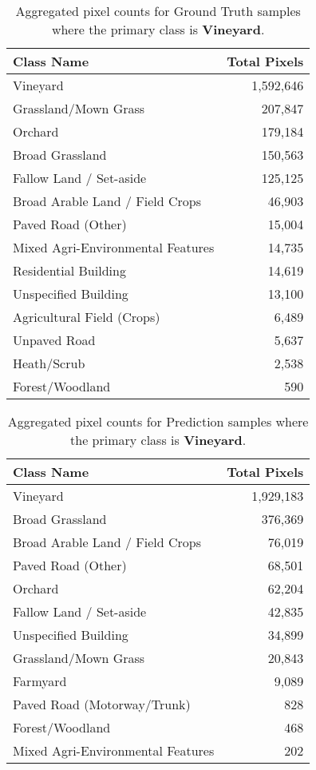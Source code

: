 \begin{table}[H] %
    \centering
    \caption{Aggregated pixel counts for Ground Truth samples where the primary class is \textbf{Vineyard}.}
    \label{tab:gt_counts_23}
    \begin{tabular}{lr}
        \hline
        \textbf{Class Name} & \textbf{Total Pixels} \\
        \hline
        Vineyard & 1,592,646 \\
        Grassland/Mown Grass & 207,847 \\
        Orchard & 179,184 \\
        Broad Grassland & 150,563 \\
        Fallow Land / Set-aside & 125,125 \\
        Broad Arable Land / Field Crops & 46,903 \\
        Paved Road (Other) & 15,004 \\
        Mixed Agri-Environmental Features & 14,735 \\
        Residential Building & 14,619 \\
        Unspecified Building & 13,100 \\
        Agricultural Field (Crops) & 6,489 \\
        Unpaved Road & 5,637 \\
        Heath/Scrub & 2,538 \\
        Forest/Woodland & 590 \\
        \hline
    \end{tabular}
\end{table}

\begin{table}[H] %
    \centering
    \caption{Aggregated pixel counts for Prediction samples where the primary class is \textbf{Vineyard}.}
    \label{tab:pred_counts_23}
    \begin{tabular}{lr}
        \hline
        \textbf{Class Name} & \textbf{Total Pixels} \\
        \hline
        Vineyard & 1,929,183 \\
        Broad Grassland & 376,369 \\
        Broad Arable Land / Field Crops & 76,019 \\
        Paved Road (Other) & 68,501 \\
        Orchard & 62,204 \\
        Fallow Land / Set-aside & 42,835 \\
        Unspecified Building & 34,899 \\
        Grassland/Mown Grass & 20,843 \\
        Farmyard & 9,089 \\
        Paved Road (Motorway/Trunk) & 828 \\
        Forest/Woodland & 468 \\
        Mixed Agri-Environmental Features & 202 \\
        \hline
    \end{tabular}
\end{table}

